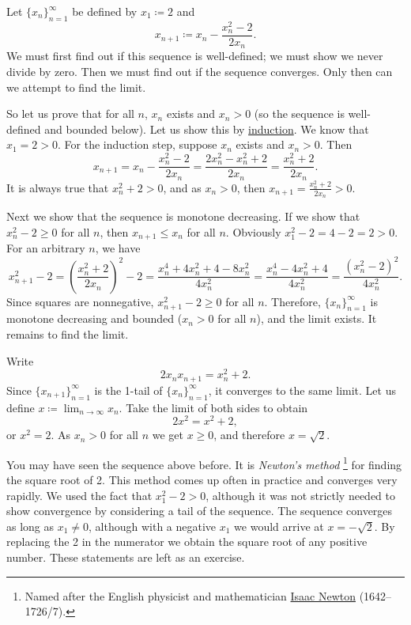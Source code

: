 \begin{example}
Let $\{ x_n \}_{n=1}^\infty$ be defined by $x_1 \coloneqq 2$ and
\begin{equation*}
x_{n+1} \coloneqq x_n - \frac{x_n^2-2}{2x_n} .
\end{equation*}
We must first find out if this sequence is well-defined; we must show we never
divide by zero.
Then we must find out if the sequence converges.  Only then
can we attempt to find the limit.

So let us prove that for all $n$,
$x_n$ exists and $x_n > 0$
(so the sequence is well-defined and bounded below).
Let us show this by \hyperref[induction:thm]{induction}.  We know that
$x_1 = 2 > 0$.  For the induction step, suppose $x_n$ exists and
$x_n > 0$.  Then
\begin{equation*}
x_{n+1} = x_n - \frac{x_n^2-2}{2x_n} =
\frac{2x_n^2 - x_n^2+2}{2x_n} =
\frac{x_n^2+2}{2x_n} .
\end{equation*}
It is always true that $x_n^2+2 > 0$,
and as
$x_n > 0$, then $x_{n+1} = \frac{x_n^2+2}{2x_n} > 0$.

Next we
show that the sequence is monotone decreasing.  If we show that
$x_n^2-2 \geq 0$ for all $n$, then $x_{n+1} \leq x_n$ for all $n$.
Obviously $x_1^2-2 = 4-2 = 2 > 0$.  For an arbitrary $n$, we have 
\begin{equation*}
x_{n+1}^2-2 =
{\left( \frac{x_n^2+2}{2x_n} \right)}^2 - 2
=
\frac{x_n^4+4x_n^2+4 - 8x_n^2}{4x_n^2}
=
\frac{x_n^4-4x_n^2+4}{4x_n^2}
=
\frac{{\left( x_n^2-2 \right)}^2}{4x_n^2} .
\end{equation*}
Since squares are nonnegative,
$x_{n+1}^2-2 \geq 0$ for all $n$.  Therefore,
$\{ x_n \}_{n=1}^\infty$ is monotone decreasing and bounded ($x_n > 0$ for all $n$), and 
the limit exists.  It remains to find the limit.

Write
\begin{equation*}
2x_nx_{n+1} = x_n^2+2 .
\end{equation*}
Since $\{ x_{n+1} \}_{n=1}^\infty$ is the 1-tail of $\{ x_n \}_{n=1}^\infty$, it converges to the
same limit.  Let us define $x \coloneqq \lim_{n\to\infty} x_n$.  Take the limit of
both sides to obtain
\begin{equation*}
2x^2 = x^2+2 ,
\end{equation*}
or $x^2 = 2$.  As $x_n > 0$ for all $n$ we get $x \geq 0$, and therefore $x = \sqrt{2}$.
\end{example}

You may have seen the sequence above before.  It is
\emph{Newton's method}%
\footnote{%
Named after the English physicist and mathematician
\href{https://en.wikipedia.org/wiki/Isaac_Newton}{Isaac Newton}
(1642--1726/7).}
for finding the square root of 2.  This method comes up often in
practice and converges very rapidly.  We used the fact that
$x_1^2 -2 >0$, although it was not strictly needed to show convergence by
considering a tail of the sequence.
The sequence converges as long as $x_1 \neq 0$, although with a negative $x_1$
we would arrive at $x=-\sqrt{2}$.  By replacing the 2 in the numerator we 
obtain the square root of any positive number.  These statements are left as
an exercise.

